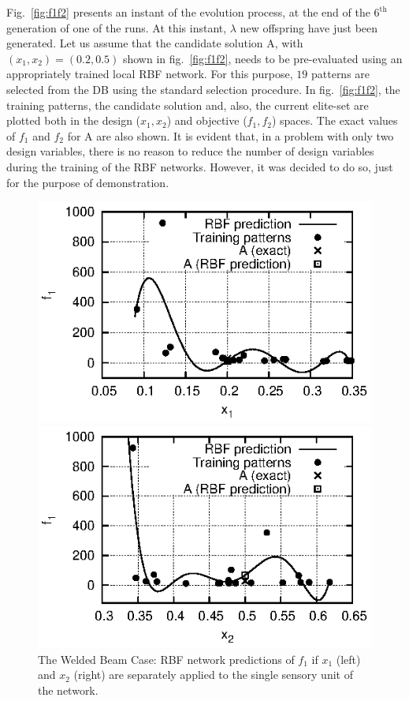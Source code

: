 Fig.\ \ref{fig:f1f2} presents an instant of the evolution process, at the end of the $6^{\mbox{th}}$ generation of one of the runs. At this instant, $\lambda$ new offspring have just been generated. Let us assume that the candidate solution A, with $(x_1, x_2)\!=\!(0.2,0.5)$  shown in fig.\ \ref{fig:f1f2}, needs to be pre-evaluated using an appropriately trained local RBF network. 
For this purpose, $19$ patterns are selected from the DB using the standard selection procedure. 
In fig.\ \ref{fig:f1f2}, the training patterns, the candidate solution and, also, the current elite-set are plotted both in the design ($x_1, x_2$) and objective ($f_1, f_2$) spaces. 
The exact values of $f_1$ and $f_2$ for A are also shown.
It is evident that, in a problem with only two design variables, there is no reason to reduce the number of design variables during the training of the RBF networks. However, it was decided to do so, just for the purpose of demonstration.  

\begin{figure}
\begin{minipage}{0.48\textwidth}
\includegraphics[scale=1.2]{IPE/f1_x1.eps}
\end{minipage}
\begin{minipage}{0.48\textwidth}
\includegraphics[scale=1.2]{IPE/f1_x2.eps}
\end{minipage}
\caption{The Welded Beam Case: RBF network predictions of $f_1$ if $x_1$ (left) and $x_2$ (right) are separately applied to the single sensory unit of the network. }
\label{fig:f1x1x2}
\end{figure}

